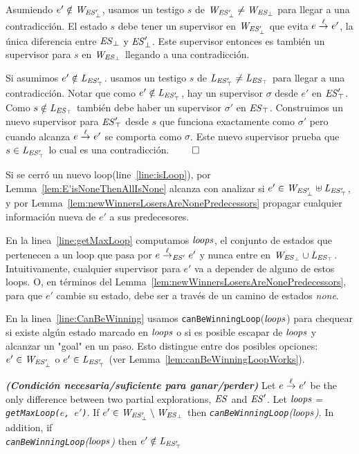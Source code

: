 \begin{Proof Sketch}
Asumiendo $e' \notin \mathit{W_{\mathit{\mathit{ES}'_{\bot}}}}$, usamos un testigo $s$ de $\mathit{W_{\mathit{\mathit{ES}'_{\bot}}}} \neq 
\mathit{W_{\mathit{\mathit{ES}_{\bot}}}}$ para llegar a una contradicción. El estado $s$ debe tener un supervisor en 
$\mathit{W_{\mathit{\mathit{ES}'_{\bot}}}}$ que evita $e \overset{\ell}{\rightarrow}_{} e'$, la única diferencia entre $\mathit{\mathit{ES}_{\bot}}$ y $\mathit{\mathit{ES}'_{\bot}}$. Este supervisor entonces es también un supervisor para $s$ en $\mathit{W_{\mathit{\mathit{ES}_{\bot}}}}$ llegando a una contradicción. 

Si asumimos $e' \notin \mathit{L_{\mathit{\mathit{ES}'_{\top}}}}$.  usamos un testigo $s$ de $\mathit{L_{\mathit{\mathit{ES}'_{\top}}}} \neq \mathit{L_{\mathit{\mathit{ES}_{\top}}}}$ para llegar a una contradicción. Notar que como $e' \notin \mathit{L_{\mathit{\mathit{ES}'_{\top}}}}$, hay un supervisor $\sigma$ desde $e'$ en  
$\mathit{\mathit{ES}'_{\top}}$. Como $s \notin \mathit{L_{\mathit{\mathit{ES}_{\top}}}}$ también debe haber un supervisor $\sigma'$ en $\mathit{\mathit{ES}_{\top}}$. Construimos un nuevo supervisor para $\mathit{\mathit{ES}'_{\top}}$ desde $s$ que funciona exactamente como $\sigma'$ pero cuando alcanza $e \overset{\ell}{\rightarrow}_{} e'$ se comporta como $\sigma$. Este nuevo supervisor prueba que $s \in \mathit{L_{\mathit{\mathit{ES}'_{\top}}}}$ lo cual es una contradicción. \hfill$\qed$
\end{Proof Sketch}

Si se cerró un nuevo loop(line~\ref{line:isLoop}), por Lemma~\ref{lem:E'isNoneThenAllIsNone} alcanza con analizar si $e' 
\in \mathit{W_{\mathit{\mathit{ES}'_{\bot}}}} \uplus \mathit{L_{\mathit{\mathit{ES}'_{\top}}}}$, y por Lemma~\ref{lem:newWinnersLosersAreNonePredecessors} propagar cualquier información nueva de $e'$ a sus predecesores. 

En la linea~\ref{line:getMaxLoop} computamos $\mathit{loops}$, el conjunto de estados que pertenecen a un loop que pasa por $e \overset{\ell}{\rightarrow}_{\mathit{ES}'} e'$ y nunca entre en $\mathit{W_{\mathit{\mathit{ES}_{\bot}}}} \cup \mathit{L_{\mathit{\mathit{ES}_{\top}}}}$. 
Intuitivamente, cualquier supervisor para $e'$ va a depender de alguno de estos loops. O, en términos del Lemma~\ref{lem:newWinnersLosersAreNonePredecessors}, para que $e'$ cambie su estado, debe ser a través de un camino de estados \textit{none}. 

En la linea~\ref{line:CanBeWinning} usamos \texttt{canBeWinningLoop}($\mathit{loops}$) para chequear si existe algún estado marcado en $\mathit{loops}$ o si es posible escapar de $\mathit{loops}$ y alcanzar un "goal" en un paso. Esto distingue entre dos posibles opciones: $e' \in \mathit{W_{\mathit{\mathit{ES}'_{\bot}}}}$ o $e' \in \mathit{L_{\mathit{\mathit{ES}'_{\top}}}}$ (ver 
Lemma~\ref{lem:canBeWinningLoopWorks}). 

\begin{lemma}\textbf{\emph{(Condición necesaria/suficiente para ganar/perder)}}
\label{lem:canBeWinningLoopWorks}
Let $e \overset{\ell}{\rightarrow}_{} e'$ be the only difference between two partial explorations, 
$\mathit{ES}$ and $\mathit{ES}'$. Let $\mathit{loops}$ = \emph{\texttt{getMaxLoop($e$, 
$e'$)}}.
If $e' \in \mathit{W_{\mathit{\mathit{ES}'_{\bot}}}} \setminus \mathit{W_{\mathit{\mathit{ES}_{\bot}}}}$ 
then \emph{\texttt{canBeWinningLoop}($\mathit{loops}$)}. In addition, if \\ 
\emph{\texttt{canBeWinningLoop}($\mathit{loops}$)} then $e' \notin \mathit{L_{\mathit{\mathit{ES}'_{\top}}}}$ 
\end{lemma}

